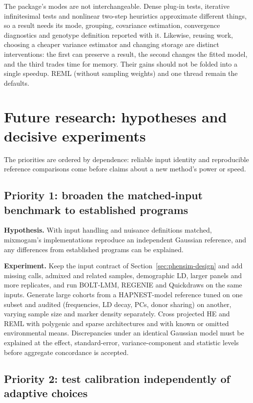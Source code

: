 \documentclass[11pt]{article}
\begin{document}
The package's modes are not interchangeable. Dense plug-in tests,
iterative infinitesimal tests and nonlinear two-step heuristics
approximate different things, so a result needs its mode, grouping,
covariance estimation, convergence diagnostics and genotype definition
reported with it. Likewise, reusing work, choosing a cheaper variance
estimator and changing storage are distinct interventions: the first can
preserve a result, the second changes the fitted model, and the third
trades time for memory. Their gains should not be folded into a single
speedup. REML (without sampling weights) and one thread remain the
defaults.

\section{Future research: hypotheses and decisive experiments}
\label{sec:future}

The priorities are ordered by dependence: reliable input identity and
reproducible reference comparisons come before claims about a new
method's power or speed.

\subsection{Priority 1: broaden the matched-input benchmark to established programs}

\textbf{Hypothesis.} With input handling and nuisance definitions matched,
mixmogam's implementations reproduce an independent Gaussian reference,
and any differences from established programs can be explained.

\textbf{Experiment.} Keep the input contract of
Section~\ref{sec:phensim-design} and add missing calls, admixed and related
samples, demographic LD, larger panels and more replicates, and run
BOLT-LMM, REGENIE and Quickdraws on the same inputs. Generate large
cohorts from a HAPNEST-model reference tuned on one subset and audited
(frequencies, LD decay, PCs, donor sharing) on another, varying sample
size and marker density separately. Cross projected HE and REML with
polygenic and sparse architectures and with known or omitted
environmental means. Discrepancies under an identical
Gaussian model must be explained at the effect, standard-error,
variance-component and statistic levels before aggregate concordance is
accepted.

\subsection{Priority 2: test calibration independently of adaptive choices}
\end{document}
